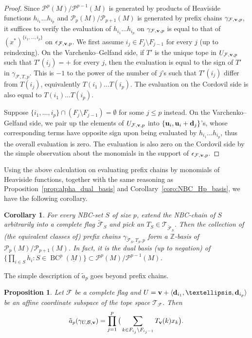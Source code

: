 \documentclass{amsart}
\newtheorem{proposition}[theorem]{Proposition}
\newtheorem{corollary}[theorem]{Corollary}
\newcommand\Bcal{{\mathcal B}}
\newcommand\Fcal{{\mathcal F}}
\newcommand\Pcal{{\mathcal P}}
\newcommand\Tcal{{\mathcal T}}
\newcommand\dd{{\bf d}}
\newcommand\uu{{\bf u}}
\newcommand\vv{{\bf v}}
\newcommand\ZZ{{\mathbb Z}}
\DeclareMathOperator{\BC}{BC}
\begin{document}
{\begin{proof}
    Since $\Pcal^p(M)/\Pcal^{p-1}(M)$ is generated by products of Heaviside functions $h_{i_1}\ldots h_{i_p}$ and $\Pcal_p(M)/\Pcal_{p+1}(M)$ is generated by prefix chains $\gamma_{\Fcal,\vv,p}$, it suffices to verify the evaluation of $h_{i_1}\ldots h_{i_p}$ on $\gamma_{\Fcal,\vv,p}$ is equal to that of $(x^*)^{\{i_1,\ldots,i_p\}}$ on $\epsilon_{\Fcal,\vv,p}$. We first assume $i_j\in F_j\setminus F_{j-1}$ for every $j$ (up to reindexing). On the Varchenko--Gelfand side, if $T'$ is the unique tope in $U_{\Fcal,\vv,p}$ such that $T'(i_j)=+$ for every $j$, then the evaluation is equal to the sign of $T'$ in $\gamma_{\Fcal,T,p}$. This is $-1$ to the power of the number of $j$'s such that $T'(i_j)$ differ from $T(i_j)$, equivalently $T(i_1)\ldots T(i_p)$.
    The evaluation on the Cordovil side is also equal to $T(i_1)\ldots T(i_p)$.

    Suppose $\{i_1,\ldots,i_p\}\cap (F_j\setminus F_{j-1})=\emptyset$ for some $j\leq p$ instead. On the Varchenko--Gelfand side, we pair up the elements of $U_{\Fcal,\vv,p}$ into $\{\uu_i,\uu_i+\dd_j\}$'s, whose corresponding terms have opposite sign upon being evaluated by $h_{i_1}\ldots h_{i_p}$, thus the overall evaluation is zero. The evaluation is also zero on the Cordovil side by the simple observation about the monomials in the support of $\epsilon_{\Fcal,\vv,p}$.
\end{proof}

Using the above calculation on evaluating prefix chains by monomials of Heaviside functions, together with the same reasoning as Proposition~\ref{prop:alpha_dual_basis} and Corollary~\ref{coro:NBC_Hp_basis}, we have the following corollary.

\begin{corollary} \label{coro:NBC_Pp_basis}
    For every NBC-set $S$ of size $p$, extend the NBC-chain of $S$ arbitrarily into a complete flag $\tilde{\Fcal}_S$ and pick an $T_S\in\Tcal_{\tilde{\Fcal}_S}$.
    Then the collection of (the equivalent classes of) prefix chains $\gamma_{\tilde{\Fcal}_S,T_S,p}$ form a $\ZZ$-basis of $\Pcal_p(M)/\Pcal_{p+1}(M)$. In fact, it is the dual basis (up to negation) of $\big\{\prod_{i\in S} h_i: S\in\BC^p(\underline{M})\big\}\subset \Pcal^p(M)/\Pcal^{p-1}(M)$.
\end{corollary}

The simple description of $\tilde{a}_p$ goes beyond prefix chains.

\begin{proposition} \label{prop:affine_image}
    Let $\Fcal$ be a complete flag and $U=\vv+\langle \dd_{i_1},\ldots,\dd_{i_p}\rangle$ be an affine coordinate subspace of the tope space $\Tcal_\Fcal$. Then $$\tilde{a}_p(\gamma_{U,\Bcal,\vv})=\prod_{j=1}^p \big(\sum_{k\in F_{i_j}\setminus F_{i_j-1}} T_\vv(k) x_k\big).$$
\end{proposition}

}
\end{document}
